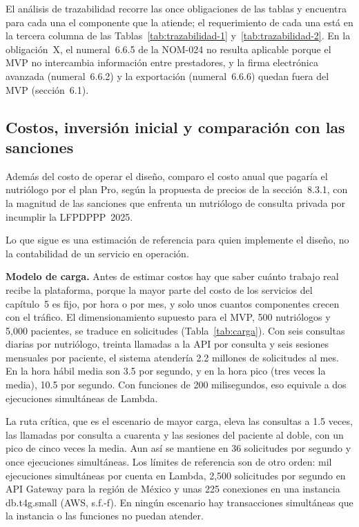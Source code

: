 \documentclass[12pt, a4paper]{article}
\begin{document}
El análisis de trazabilidad recorre las once obligaciones de las tablas
y encuentra para cada una el componente que la atiende; el requerimiento
de cada una está en la tercera columna de las
Tablas~\ref{tab:trazabilidad-1} y~\ref{tab:trazabilidad-2}. En la
obligación~X, el numeral~6.6.5 de la NOM-024 no resulta aplicable porque
el MVP no intercambia información entre prestadores, y la firma
electrónica avanzada (numeral~6.6.2) y la exportación (numeral~6.6.6)
quedan fuera del MVP (sección~6.1).
 


\subsection{Costos, inversión inicial y comparación con las sanciones}
\label{sec:costos}
 
Además del costo de operar el diseño, comparo el costo anual que pagaría el nutriólogo por el
plan Pro, según la propuesta de precios de la sección~8.3.1, con la magnitud de las sanciones que enfrenta un
nutriólogo de consulta privada por incumplir la LFPDPPP~2025.
 
Lo que sigue es una estimación de referencia para quien implemente el
diseño, no la contabilidad de un servicio en operación.
 
\textbf{Modelo de carga.} Antes de estimar costos hay que saber cuánto
trabajo real recibe la plataforma, porque la mayor parte del costo de
los servicios del capítulo~5 es fijo, por hora o por mes, y solo unos
cuantos componentes crecen con el tráfico. El dimensionamiento supuesto
para el MVP, 500 nutriólogos y 5,000 pacientes, se traduce en
solicitudes (Tabla~\ref{tab:carga}). Con seis consultas diarias por
nutriólogo, treinta llamadas a la API por consulta y seis sesiones
mensuales por paciente, el sistema atendería 2.2 millones de solicitudes
al mes. En la hora hábil media son 3.5 por segundo, y en la hora pico
(tres veces la media), 10.5 por segundo. Con funciones de 200
milisegundos, eso equivale a dos ejecuciones simultáneas de Lambda.

La ruta crítica, que es el escenario de mayor carga, eleva las consultas a 1.5 veces, las llamadas por
consulta a cuarenta y las sesiones del paciente al doble, con un pico de
cinco veces la media. Aun así se mantiene en 36 solicitudes por segundo
y once ejecuciones simultáneas. Los límites de referencia son de otro
orden: mil ejecuciones simultáneas por cuenta en Lambda, 2,500
solicitudes por segundo en API Gateway para la región de México y unas
225 conexiones en una instancia db.t4g.small (AWS, s.f.-f). En ningún
escenario hay transacciones simultáneas que la instancia o las funciones
no puedan atender.
 
\end{document}
